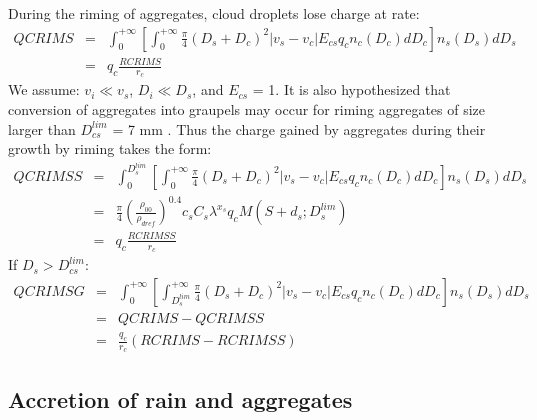 During the riming of aggregates, cloud droplets lose charge at rate:
\begin{eqnarray}
  QCRIMS &=& \int_0 ^{+ \infty} \left[ \int_0 ^{+ \infty}
             \frac{\pi}{4} (D_s + D_c)^2 |v_s - v_c| E_{cs} q_c n_c (D_c) dD_c
             \right] n_s (D_s) dD_s \nonumber \\
         &=& q_c \frac{RCRIMS}{r_c}
\end{eqnarray}
We assume: $v_i \ll v_s$, $D_i \ll D_s$, and $E_{cs}$ = 1.
It is also hypothesized that conversion of aggregates into graupels may occur for riming aggregates of size larger than $D_{cs} ^{lim}$ = 7 mm \citep{Farley-1989}.
Thus the charge gained by aggregates during their growth by riming takes the form:
\begin{eqnarray}
  QCRIMSS &=& \int_0 ^{D_s ^{lim}} \left[ \int_0 ^{+ \infty}
              \frac{\pi}{4} (D_s + D_c)^2 |v_s - v_c| E_{cs} q_c n_c (D_c) dD_c
              \right] n_s (D_s) dD_s \nonumber \\
          &=& \frac{\pi}{4} 
              \left( \frac{\rho _{00}}{\rho _{dref}} \right)^{0.4}
              c_s C_s \lambda ^{x_s} q_c M(S + d_s ; D_s ^{lim}) \nonumber \\
          &=& q_c \frac{RCRIMSS}{r_c}
\end{eqnarray}
If $D_s > D_{cs} ^{lim}$:
\begin{eqnarray}
  QCRIMSG &=& \int_0 ^{+ \infty} \left[ \int_{D_s ^{lim}} ^{+ \infty}
              \frac{\pi}{4} (D_s + D_c)^2 |v_s - v_c| E_{cs} q_c n_c (D_c) dD_c
              \right] n_s (D_s) dD_s \nonumber \\
          &=& QCRIMS - QCRIMSS \nonumber \\
          &=& \frac{q_c}{r_c} (RCRIMS - RCRIMSS)
\end{eqnarray}

\subsection{Accretion of rain and aggregates}

